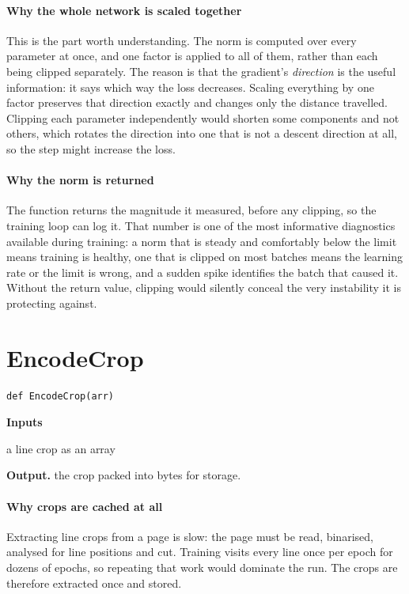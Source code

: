 \paragraph{Why the whole network is scaled together}
This is the part worth understanding. The norm is computed over every parameter at once, and one factor is applied to all of them, rather than each being clipped separately. The reason is that the gradient's \emph{direction} is the useful information: it says which way the loss decreases. Scaling everything by one factor preserves that direction exactly and changes only the distance travelled. Clipping each parameter independently would shorten some components and not others, which rotates the direction into one that is not a descent direction at all, so the step might increase the loss.


\paragraph{Why the norm is returned}
The function returns the magnitude it measured, before any clipping, so the training loop can log it. That number is one of the most informative diagnostics available during training: a norm that is steady and comfortably below the limit means training is healthy, one that is clipped on most batches means the learning rate or the limit is wrong, and a sudden spike identifies the batch that caused it. Without the return value, clipping would silently conceal the very instability it is protecting against.


\section{EncodeCrop}
\begin{lstlisting}[style=sig]
def EncodeCrop(arr)
\end{lstlisting}

\noindent\textbf{Inputs}
\begin{description}[leftmargin=2.2em,style=nextline,font=\normalfont\ttfamily]\setlength\itemsep{1pt}
  \item[{arr}] \normalfont a line crop as an array
\end{description}

\noindent\textbf{Output.} the crop packed into bytes for storage.


\paragraph{Why crops are cached at all}
Extracting line crops from a page is slow: the page must be read, binarised, analysed for line positions and cut. Training visits every line once per epoch for dozens of epochs, so repeating that work would dominate the run. The crops are therefore extracted once and stored.


